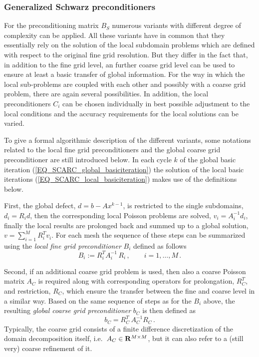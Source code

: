 \subsubsection{Generalized Schwarz preconditioners}
For the preconditioning matrix $B_S$ %
numerous variants with different degree of complexity can be applied.
All these variants have in common that they essentially rely on the solution of the local subdomain problems which are defined with respect to the original fine grid resolution. 
But they differ in the fact that, in addition to the fine grid level, an further coarse grid level can be used to ensure at least a basic transfer of global information. 
%
For the way in which the local sub-problems are coupled with each other and possibly with a coarse grid problem, there are again several possibilities. 
In addition, the local preconditioners $C_i$ can be chosen individually in best possible adjustment to the local conditions and
the accuracy requirements for the local solutions can be varied. 

To give a formal algorithmic description of the different variants, some notations related to the local fine grid preconditioners and the global coarse grid preconditioner are still introduced below.
In each cycle $k$ of the global basic iteration (\ref{EQ_SCARC_global_basiciteration}) 
the solution of the local basic iterations (\ref{EQ_SCARC_local_basiciteration}) makes use of the definitions below. 

First, the global defect, $d = b - Ax^{k-1}$, is restricted to the single subdomains, $d_i=R_i d$, then the corresponding local Poisson problems are solved, $v_i=A_i^{-1}d_i$, finally the local results are  prolonged back and summed up to a global solution, $v=\sum_{i=1}^M R_i^T v_i$. 
For each mesh the sequence of these steps can be summarized using the {\it local fine grid preconditioner} $B_i$ defined as follows
\[ B_i := R_i^T A_i^{-1}\,R_i\,,\qquad i=1,\ldots, M\,. \]

Second, if an additional coarse grid problem is used, then also a coarse Poisson matrix $A_C$ is required along with corresponding operators for prolongation, $R_C^T$, and restriction, $R_C$, 
which ensure the transfer between the fine and coarse level in a similar way.
Based on the same sequence of steps as for the $B_i$ above, the resulting {\it global coarse grid preconditioner} $b_C$ is then defined as
\[ b_C = R_C^T \,A_C^{-1}  R_C\,.\] 
Typically, the coarse grid consists of a finite difference discretization of the domain decomposition itself, i.e.\ $A_C \in {\bf R}^{M \times M}$, but it can also refer to a (still very) coarse refinement of it. 

